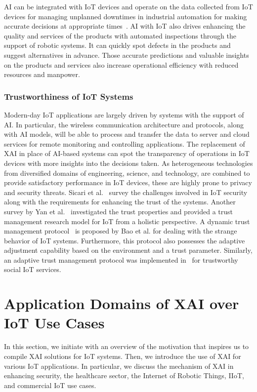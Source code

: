 \documentclass[journal]{IEEEtran}
\begin{document}
AI can be integrated with IoT devices and operate on the data collected from IoT devices for managing unplanned downtimes in industrial automation for making accurate decisions at appropriate times~\cite{lv2021ai}. AI with IoT also drives enhancing the quality and services of the products with automated inspections through the support of robotic systems. It can quickly spot defects in the products and suggest alternatives in advance. Those accurate predictions and valuable insights on the products and services also increase operational efficiency with reduced resources and manpower. 

\subsubsection{Trustworthiness of IoT Systems}

Modern-day IoT applications are largely driven by systems with the support of AI. In particular, the wireless communication architecture and protocols, along with AI models, will be able to process and transfer the data to server and cloud services for remote monitoring and controlling applications. The replacement of XAI in place of AI-based systems can spot the transparency of operations in IoT devices with more insights into the decisions taken. As heterogeneous technologies from diversified domains of engineering, science, and technology, are combined to provide satisfactory performance in IoT devices, these are highly prone to privacy and security threats. Sicari et al.~\cite{sicari2015security} survey the challenges involved in IoT security along with the requirements for enhancing the trust of the systems. Another survey by Yan et al.~\cite{yan2014survey} investigated the trust properties and provided a trust management research model for IoT from a holistic perspective. A dynamic trust management protocol~\cite{bao2012dynamic} is proposed by Bao et al. for dealing with the strange behavior of IoT systems. Furthermore, this protocol also possesses the adaptive adjustment capability based on the environment and a trust parameter. Similarly, an adaptive trust management protocol was implemented in~\cite{chen2015trust} for trustworthy social IoT services.

\section{Application Domains of XAI over IoT Use Cases}
\label{sec:XAIapplications}

In this section, we initiate with an overview of the motivation that inspires us to compile XAI solutions for IoT systems. Then, we introduce the use of XAI for various IoT applications. In particular, we discuss the mechanism of XAI in enhancing security, the healthcare sector, the Internet of Robotic Things, IIoT, and commercial IoT use cases.
\end{document}
